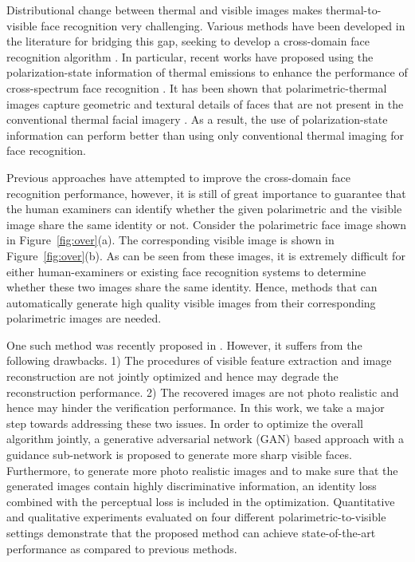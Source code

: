 \documentclass[10pt,twocolumn,letterpaper]{article}
\begin{document}
Distributional change between thermal and visible images makes thermal-to-visible face recognition very challenging.  Various methods have been developed in the literature for bridging this gap, seeking to develop a cross-domain face recognition algorithm \cite{cross_domain3,face_cross1,face_cross2,cross_5}.  In particular, recent works have proposed using the polarization-state information of thermal emissions to enhance the performance of cross-spectrum face recognition \cite{ ijcb_datasets2, btas_2016, ijcb_datasets}.  It has been shown that polarimetric-thermal images capture geometric and textural details of faces that are not present in the conventional thermal facial imagery \cite{ijcb_datasets}.    As a result, the use of polarization-state information can perform better than using only conventional thermal imaging for face recognition.



Previous approaches have attempted to improve the cross-domain face recognition performance, however, it is still of great importance to guarantee that the human examiners can identify whether the given polarimetric and the visible image share the same identity or not.  Consider the polarimetric face image shown in Figure~\ref{fig:over}(a).  The corresponding visible image is shown in Figure~\ref{fig:over}(b).  As can be seen from these images, it is extremely difficult for either human-examiners or existing face  recognition systems to determine whether these two images share the same identity.   Hence, methods that can automatically generate high quality visible images from their corresponding polarimetric images are needed.  


One such method was recently proposed in \cite{btas_2016}.    However, it suffers from the following drawbacks.  1) The procedures of visible feature extraction and image reconstruction are not jointly optimized and hence may degrade the reconstruction performance.  2) The recovered images are not photo realistic and hence may hinder the verification performance.   In this work,  we take a major step towards  addressing these two issues.  In order to optimize the overall algorithm jointly, a generative adversarial network (GAN) based approach with a guidance sub-network is proposed to generate more sharp visible faces.  Furthermore, to generate more photo realistic images and to make sure that the generated images contain highly discriminative information, an identity loss combined with the perceptual loss is included in the optimization.  Quantitative and qualitative experiments evaluated on  four different polarimetric-to-visible settings demonstrate that the proposed method can achieve state-of-the-art performance as compared to previous methods.   
\end{document}
